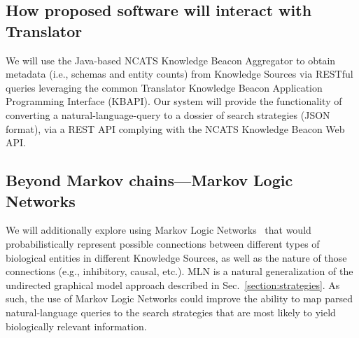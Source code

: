 \documentclass[11pt,notitlepage]{article}
\begin{document}
\subsection{How proposed software will interact with Translator}
\label{sec:interact}
We will use the Java-based NCATS Knowledge Beacon Aggregator to obtain metadata
(i.e., schemas and entity counts) from Knowledge Sources via RESTful queries
leveraging the common Translator Knowledge Beacon Application Programming
Interface (KBAPI). Our system will provide the functionality of converting a
natural-language-query to a dossier of search strategies (JSON format), via a REST API
complying with the NCATS Knowledge Beacon Web API. %

\subsection{Beyond Markov chains---Markov Logic Networks}
We will additionally explore using Markov Logic
Networks~\cite{Domingos:2012wi,domingos20071} that would probabilistically
represent possible connections between different types of biological entities in
different Knowledge Sources, as well as the nature of those connections (e.g.,
inhibitory, causal, etc.). MLN is a natural generalization of the undirected
graphical model approach described in Sec.~\ref{section:strategies}. As such,
the use of Markov Logic Networks could improve the ability to map parsed
natural-language queries to the search strategies that are most likely to yield
biologically relevant information.
\end{document}
